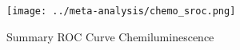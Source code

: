 \begin{figure}[p]
\centering

\texttt{[image: ../meta-analysis/chemo\_sroc.png]}

\caption[Summary ROC Curve Chemiluminescence]{Summary ROC Curve Chemiluminescence}
\label{fig:chemo_sroc}
\end{figure}
